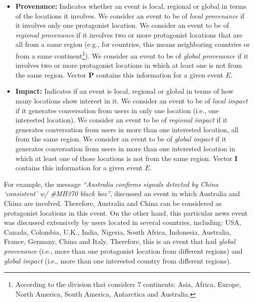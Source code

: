 \begin{itemize}
\item{\bf Provenance:} 
%
Indicates whether an event is local, regional or global in terms of the
locations it involves.
%
We consider an event to be of {\em local provenance} if it involves only one
protagonist location. 
%
We consider an event to be of {\em regional provenance} if it involves two or
more protagonist locations that are all from a same region (e.g., for countries,
this means neighboring countries or from a same continent\footnote{According to
the division that considers 7 continents: Asia, Africa, Europe, North America,
South America, Antarctica and Australia.}). 
%
We consider an event to be of {\em global provenance} if it involves two or more
protagonist locations in which at least one is not from the same region. 
%
Vector $\mathbf{P}$ contains this information for a given event $E$.


\item{\bf Impact:} 
%
Indicates if an event is local, regional or global in terms of how many
locations show interest in it. 
%
We consider an event to be of {\em local impact} if it generates conversation
from users in only one location (i.e., one interested location). 
%
We consider an event to be of {\em regional impact} if it generates conversation
from users in more than one interested location, all from the same region.  
%
We consider an event to be of {\em global impact} if it generates conversation
from users in more than one interested location in which at least one of those
locations is not from the same region. 
%
Vector $\mathbf{I}$ contains this information for a given event $E$.
\end{itemize}

For example, the message {\em ``Australia confirms signals detected by China
`consistent' w/ \#MH370 black box''}, discussed an event in which Australia and
China are involved. 
%
Therefore, Australia and China can be considered as protagonist locations in
this event. 
%
On the other hand, this particular news event was discussed extensively by users
located in several countries, including: USA, Canada, Colombia, U.K., India,
Nigeria, South Africa, Indonesia, Australia, France, Germany, China and Italy.
%
Therefore, this is an event that had {\em global provenance} (i.e., more than
one protagonist location from different regions) and {\em global impact} (i.e.,
more than one interested country from different regions).


